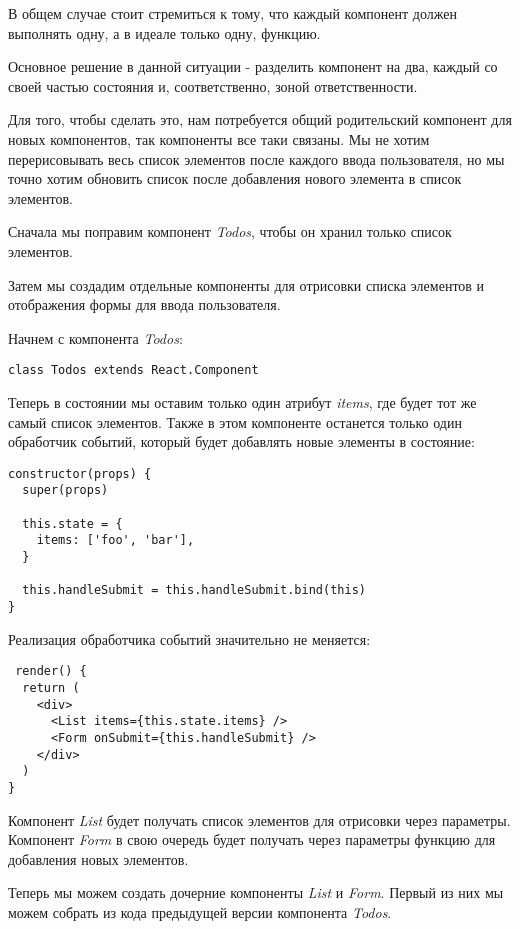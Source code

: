 В общем случае стоит стремиться к тому, что каждый компонент должен выполнять одну, а в идеале только одну, функцию.

Основное решение в данной ситуации - разделить компонент на два, каждый со своей частью состояния и, соответственно, зоной ответственности.

Для того, чтобы сделать это, нам потребуется общий родительский компонент для новых компонентов, так компоненты все таки связаны. Мы не хотим перерисовывать весь список элементов после каждого ввода пользователя, но мы точно хотим обновить список после добавления нового элемента в список элементов.

Сначала мы поправим компонент \textit{Todos}, чтобы он хранил только список элементов. 

Затем мы создадим отдельные компоненты для отрисовки списка элементов и отображения формы для ввода пользователя.

Начнем с компонента \textit{Todos}:

\begin{lstlisting}
class Todos extends React.Component
\end{lstlisting}

Теперь в состоянии мы оставим только один атрибут \textit{items}, где будет тот же самый список элементов. Также в этом компоненте останется только один обработчик событий, который будет добавлять новые элементы в состояние:

\begin{lstlisting}
constructor(props) {
  super(props)
  
  this.state = {
    items: ['foo', 'bar'],
  }
  
  this.handleSubmit = this.handleSubmit.bind(this)
}
\end{lstlisting}

Реализация обработчика событий значительно не меняется:

\begin{lstlisting}
 render() {
  return (
    <div>
      <List items={this.state.items} />
      <Form onSubmit={this.handleSubmit} />
    </div>
  )
}
\end{lstlisting}

Компонент \textit{List} будет получать список элементов для отрисовки через параметры. Компонент \textit{Form} в свою очередь будет получать через параметры функцию для добавления новых элементов.

Теперь мы можем создать дочерние компоненты \textit{List} и \textit{Form}. Первый из них мы можем собрать из кода предыдущей версии компонента \textit{Todos}.

